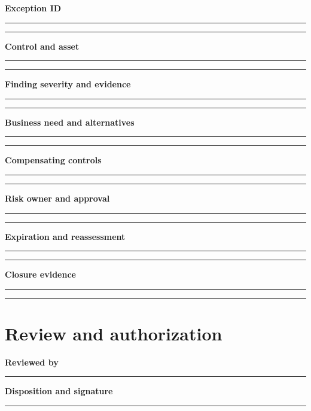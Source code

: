 \documentclass[10pt,letterpaper]{article}
\begin{document}
\textbf{Exception ID}\par
\noindent\rule{\linewidth}{0.35pt}\par\vspace{0.7em}
\noindent\rule{\linewidth}{0.35pt}\par\vspace{0.7em}
\textbf{Control and asset}\par
\noindent\rule{\linewidth}{0.35pt}\par\vspace{0.7em}
\noindent\rule{\linewidth}{0.35pt}\par\vspace{0.7em}
\textbf{Finding severity and evidence}\par
\noindent\rule{\linewidth}{0.35pt}\par\vspace{0.7em}
\noindent\rule{\linewidth}{0.35pt}\par\vspace{0.7em}
\textbf{Business need and alternatives}\par
\noindent\rule{\linewidth}{0.35pt}\par\vspace{0.7em}
\noindent\rule{\linewidth}{0.35pt}\par\vspace{0.7em}
\textbf{Compensating controls}\par
\noindent\rule{\linewidth}{0.35pt}\par\vspace{0.7em}
\noindent\rule{\linewidth}{0.35pt}\par\vspace{0.7em}
\textbf{Risk owner and approval}\par
\noindent\rule{\linewidth}{0.35pt}\par\vspace{0.7em}
\noindent\rule{\linewidth}{0.35pt}\par\vspace{0.7em}
\textbf{Expiration and reassessment}\par
\noindent\rule{\linewidth}{0.35pt}\par\vspace{0.7em}
\noindent\rule{\linewidth}{0.35pt}\par\vspace{0.7em}
\textbf{Closure evidence}\par
\noindent\rule{\linewidth}{0.35pt}\par\vspace{0.7em}
\noindent\rule{\linewidth}{0.35pt}\par\vspace{0.7em}
\section{Review and authorization}
\textbf{Reviewed by}\par
\noindent\rule{\linewidth}{0.35pt}\par\vspace{0.7em}
\textbf{Disposition and signature}\par
\noindent\rule{\linewidth}{0.35pt}\par\vspace{0.7em}
\end{document}
